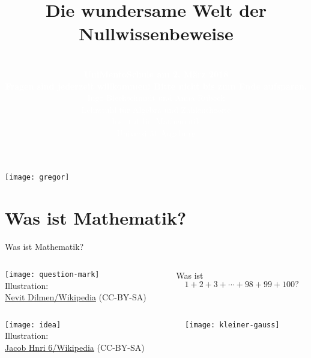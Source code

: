 \documentclass[12pt,compress,ngerman,utf8,t]{beamer}
\title[Nullwissenbeweise]{Die wundersame Welt der \\ Nullwissenbeweise}
\author[Ingo Blechschmidt, Anna Rubeck]{\scriptsize
\vspace*{-1em} \\
\textcolor{white}{\textbf{UniMentoSchule am 2. März 2018} \\
\textbf{Fragen sind jederzeit willkommen! Bitte nicht bis zum Ende
aufsparen.} \\
\medskip
Ingo Blechschmidt und Anna Rubeck \\
Lehrstuhl für Algebra und Zahlentheorie \\
Institut für Mathematik \\
Universität Augsburg}}
\newcommand{\withsource}[2]{\begin{center}#1\\\tiny #2\end{center}}
\begin{document}
{
\begin{frame}
  \centering
  {\qquad\quad\!}\texttt{[image: gregor]}
  \vspace*{-0.5em}

  \titlepage
\end{frame}}

\addtocounter{framenumber}{-2}


\section{Was ist Mathematik?}

\begin{frame}{Was ist Mathematik?}
  \vspace*{-1em}
  \begin{columns}[c]
    \begin{column}{0.2\textwidth}
      \withsource{
        \texttt{[image: question-mark]}
      }{
        Illustration: \\
        \href{https://commons.wikimedia.org/wiki/File:Question_mark_1.svg}{Nevit
        Dilmen/Wikipedia} (CC-BY-SA)
      }
    \end{column}

    \begin{column}{0.7\textwidth}
      \large\centering
      Was ist{\quad}
      \[ 1 + 2 + 3 + \cdots + 98 + 99 + 100? \]
    \end{column}
  \end{columns}

  \pause

  \begin{columns}[c]
    \begin{column}{0.2\textwidth}
      \withsource{
        \texttt{[image: idea]}
      }{
        Illustration: \\
        \href{https://commons.wikimedia.org/wiki/File:Crystal_Clear_app_ktip.svg}{Jacob
        Hnri 6/Wikipedia} (CC-BY-SA)
      }
    \end{column}

    \begin{column}{0.7\textwidth}
      \texttt{[image: kleiner-gauss]}
    \end{column}
  \end{columns}
\end{frame}
\end{document}
